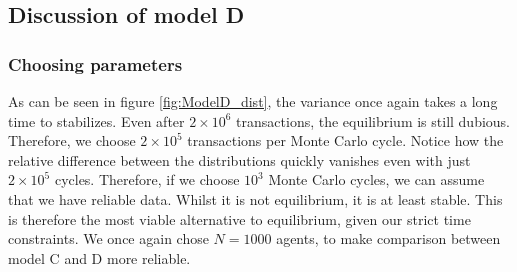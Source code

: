\documentclass[a4paper, 10pt]{article}
\begin{document}
\subsection{Discussion of model D}
\subsubsection{Choosing parameters}
As can be seen in figure \ref{fig:ModelD_dist}, the variance once again takes a long time to stabilizes. Even after $2\times 10^6$ transactions, the equilibrium is still dubious. Therefore, we choose $2 \times 10^5$ transactions per Monte Carlo cycle. Notice how the relative difference between the distributions quickly vanishes even with just $2\times 10^5$ cycles. Therefore, if we choose $10^3$ Monte Carlo cycles, we can assume that we have reliable data. Whilst it is not equilibrium, it is at least stable. This is therefore the most viable alternative to equilibrium, given our strict time constraints. We once again chose $N=1000$ agents, to make comparison between model C and D more reliable. 
\end{document}
